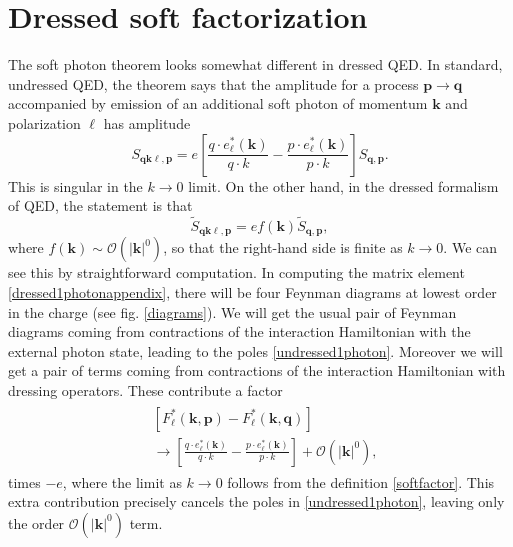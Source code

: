 \documentclass[twocolumn,prd]{revtex4}
\newcommand{\Oi}{\mathcal{O}}
\newcommand{\be}{\begin{equation}}
\newcommand{\ee}{\end{equation}}
\newcommand{\mb}{\mathbf}
\begin{document}
\section{Dressed soft factorization} The soft photon theorem looks somewhat different in dressed QED. In standard, undressed QED, the theorem says that the amplitude for a process $\mb{p} \to \mb{q}$ accompanied by emission of an additional soft photon of momentum $\mb{k}$ and polarization $\ell$ has amplitude 
\be
\label{undressed1photon}
S_{\mb{q} \mb{k} \ell, \mb{p}} = e \left[ \frac{q \cdot e^*_{\ell}(\mb{k})}{q \cdot k} - \frac{p \cdot e^*_{\ell}(\mb{k})}{p \cdot k} \right]  S_{\mb{q}, \mb{p}}.
\ee
This is singular in the $k \to 0$ limit. On the other hand, in the dressed formalism of QED, the statement is that
\be
\label{dressed1photonappendix}
\tilde{S}_{\mb{q} \mb{k} \ell, \mb{p}} = e f(\mb{k}) \tilde{S}_{\mb{q}, \mb{p}},
\ee
where $f(\mb{k}) \sim \Oi(|\mb{k}|^0)$, so that the right-hand side is finite as $k \to 0$. We can see this by straightforward computation. In computing the matrix element \eqref{dressed1photonappendix}, there will be four Feynman diagrams at lowest order in the charge (see fig. \ref{diagrams}). We will get the usual pair of Feynman diagrams coming from contractions of the interaction Hamiltonian with the external photon state, leading to the poles \eqref{undressed1photon}. Moreover we will get a pair of terms coming from contractions of the interaction Hamiltonian with dressing operators. These contribute a factor
\begin{align}
\begin{split}
\label{dressedadditions}
& \left[ F^*_{\ell}(\mb{k},\mb{p}) - F^*_{\ell}(\mb{k},\mb{q}) \right] \\ 
& \to \left[ \frac{q \cdot e^*_{\ell}(\mb{k})}{q \cdot k} - \frac{p \cdot e^*_{\ell}(\mb{k})}{p \cdot k} \right] + \Oi(|\mb{k}|^0),
\end{split}
\end{align}
times $-e$, where the limit as $k \to 0$ follows from the definition \eqref{softfactor}. This extra contribution precisely cancels the poles in \eqref{undressed1photon}, leaving only the order $\Oi(|\mb{k}|^0)$ term.









\end{document}
